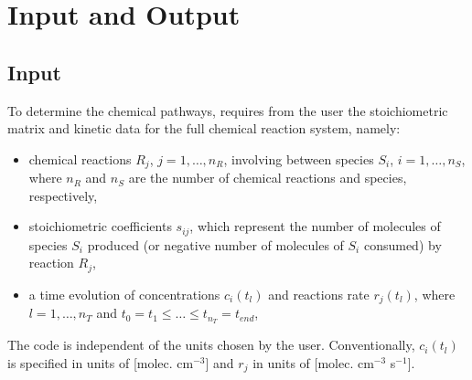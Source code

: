 
\chapter{Input and Output}
\label{chap_3}


\section{Input}
\label{sec_3_1}

To determine the chemical pathways, \pump{} requires from the user the stoichiometric 
matrix and kinetic data for the full chemical reaction system, namely:
\begin{itemize}
\item {chemical reactions $R_j$, $j = 1, \ldots, n_R$, involving between 
species $S_i$, $i = 1,\ldots, n_S$,
where $n_R$ and $n_S$ are the number of chemical reactions and species, respectively,
}
\item {stoichiometric coefficients $s_{ij}$, which represent the number of 
molecules of species $S_i$ produced (or negative number of molecules of 
$S_i$ consumed) by reaction $R_j$,}
\item{a time evolution of concentrations $c_i(t_l)$ and reactions rate $r_j(t_l)$, 
where $l = 1, \ldots, n_T$ and $t_0 = t_1\leq\ldots \leq t_{n_T}=t_{end}$,}
\end{itemize}
The code is independent of the units chosen by the user.  Conventionally, $c_i(t_l)$ is specified in units of [molec. cm$^{-3}$] and $r_j$ in units of [molec. cm$^{-3}$ s$^{-1}$].

